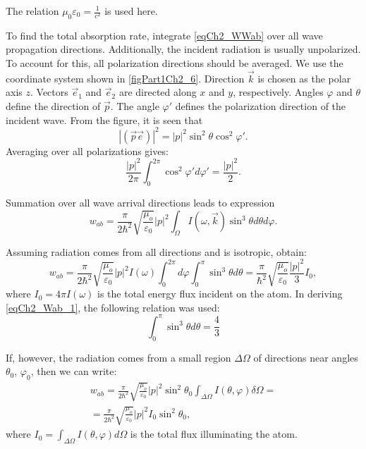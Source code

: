 The relation $\mu_0 \varepsilon_0 = \frac{1}{c^2}$ is used here.



To find the total absorption rate, integrate \eqref{eqCh2_WWab} over all wave propagation directions. Additionally, the incident radiation is usually unpolarized. To account for this, all polarization directions should be averaged. We use the coordinate system shown in \autoref{figPart1Ch2_6}. Direction $\vec{k}$ is chosen as the polar axis $z$. Vectors $\vec{e}_1$ and $\vec{e}_2$ are directed along $x$ and $y$, respectively. Angles $\varphi$ and $\theta$ define the direction of $\vec{p}$. The angle $\varphi'$ defines the polarization direction of the incident wave. From the figure, it is seen that
\[
\left|\left(\vec{p} \vec{e}\right)\right|^2 = 
\left|p\right|^2 \sin^2 \theta \cos^2 \varphi'. 
\]
Averaging over all polarizations gives: 
\begin{equation}
\frac{\left|p\right|^2}{2 \pi} \int_0^{2 \pi}
\cos^2 \varphi' d \varphi' = \frac{\left|p\right|^2}{2}.
\label{eqCh2_PolyarMedian}
\end{equation}

Summation over all wave arrival directions leads to expression
\begin{equation}
w_{ab} = \frac{\pi}{2 \hbar^2}\sqrt{\frac{\mu_o}{\varepsilon_0}}
\left|p\right|^2
\int_{\Omega}I\left(\omega, \vec{k}\right)
\sin^3 \theta d \theta d \varphi.
\end{equation}

Assuming radiation comes from all directions and is isotropic, obtain: 
\begin{equation}
w_{ab} = \frac{\pi}{2 \hbar^2}\sqrt{\frac{\mu_o}{\varepsilon_0}}
\left|p\right|^2 I\left(\omega\right)
\int_{0}^{2 \pi}d \varphi \int_0^{\pi}
\sin^3 \theta d \theta = 
\frac{\pi}{ \hbar^2}\sqrt{\frac{\mu_o}{\varepsilon_0}}
\frac{\left|p\right|^2}{3}I_0,
\label{eqCh2_Wab_1}
\end{equation}
where $I_0 = 4 \pi I\left(\omega\right)$ is the total energy flux incident on the atom. In deriving \eqref{eqCh2_Wab_1}, the following relation was used:
\[
 \int_0^{\pi}
\sin^3 \theta d \theta = \frac{4}{3}
\]

If, however, the radiation comes from a small region $\Delta \Omega$ of directions near angles $\theta_0$, $\varphi_0$, then we can write:  
\begin{eqnarray}
w_{ab} = \frac{\pi}{2 \hbar^2}\sqrt{\frac{\mu_o}{\varepsilon_0}}
\left|p\right|^2 \sin^2 \theta_0
\int_{\Delta \Omega} I\left(\theta, \varphi\right)
\delta \Omega = 
\nonumber \\
= 
\frac{\pi}{2 \hbar^2}\sqrt{\frac{\mu_o}{\varepsilon_0}}
\left|p\right|^2  I_0 \sin^2 \theta_0,
\label{eqCh2_Wab_2}
\end{eqnarray}
where $I_0 = \int_{\Delta \Omega} I\left(\theta, \varphi\right)
d \Omega$ is the total flux illuminating the atom.


